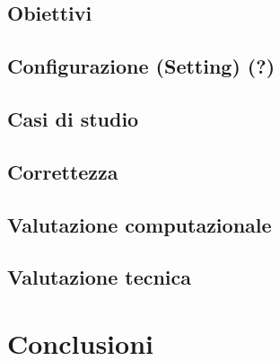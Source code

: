 \documentclass[Lau,binding=0.6cm]{sapthesis}
\begin{document}
\section{Obiettivi}

\section{Configurazione (Setting) (?)}

\section{Casi di studio}

\section{Correttezza}

\section{Valutazione computazionale}

\section{Valutazione tecnica}

\chapter{Conclusioni}

\backmatter
\end{document}
